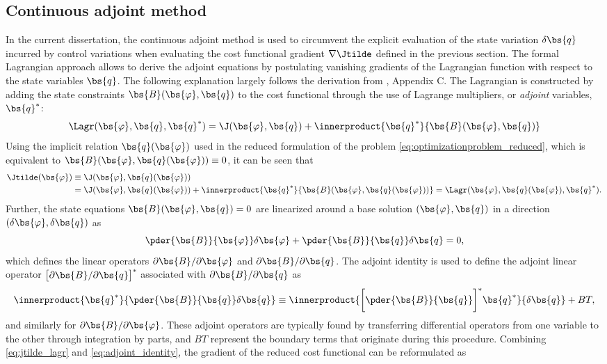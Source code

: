 	\subsection{Continuous adjoint method}
	In the current dissertation, the continuous adjoint method is used to circumvent the explicit evaluation of the state variation $\delta \bs{q}$ incurred by control variations when evaluating the cost functional gradient $\nabla \Jtilde$ defined in the previous section. The formal Lagrangian approach \citep{troltzsch, borzinschulz} allows to derive the adjoint equations by postulating vanishing gradients of the Lagrangian function with respect to the state variables $\bs{q}$. The following explanation largely follows the derivation from \cite{goit2015optimal}, Appendix C. The Lagrangian is constructed by adding the state constraints $\bs{B}(\bs{\varphi}, \bs{q})$ to the cost functional through the use of Lagrange multipliers, or \emph{adjoint} variables, $\bs{q}^*$:
	\begin{equation}
		\Lagr(\bs{\varphi}, \bs{q}, \bs{q}^*) = \J(\bs{\varphi}, \bs{q}) + \innerproduct{\bs{q}^*}{\bs{B}(\bs{\varphi}, \bs{q})}
	\end{equation} 
	Using the implicit relation $\bs{q}(\bs{\varphi})$ used in the reduced formulation of the problem 
	\eqref{eq:optimizationproblem_reduced}, which is equivalent to $\bs{B}(\bs{\varphi}, \bs{q}(\bs{\varphi})) \equiv 0$, it can be seen that
	\begin{align}
	\Jtilde(\bs{\varphi}) &\equiv  \J(\bs{\varphi}, \bs{q}(\bs{\varphi})) \nonumber\\ 
						  & = \J(\bs{\varphi}, \bs{q}(\bs{\varphi})) + \innerproduct{\bs{q}^*}{\bs{B}(\bs{\varphi}, \bs{q}(\bs{\varphi}))} =\Lagr(\bs{\varphi}, \bs{q}(\bs{\varphi}), \bs{q}^*). \label{eq:jtilde_lagr}
	\end{align} 
	Further, the state equations $\bs{B}(\bs{\varphi}, \bs{q}) = 0$ are linearized around a base solution $(\bs{\varphi}, \bs{q})$ in a direction $(\delta \bs{\varphi}, \delta \bs{q})$ as
	\begin{equation}
		\pder{\bs{B}}{\bs{\varphi}} \delta \bs{\varphi} + \pder{\bs{B}}{\bs{q}} \delta \bs{q} = 0, 
	\end{equation}
	which defines the linear operators $\partial \bs{B} /\partial \bs{\varphi}$ and $\partial \bs{B} /\partial \bs{q}$. The adjoint identity is used to define the adjoint linear operator $\big[ \partial \bs{B} /\partial \bs{q}\big]^*$ associated with $\partial \bs{B} /\partial \bs{q}$ as
	\begin{equation}
		\innerproduct{\bs{q}^* }{\pder{\bs{B}}{\bs{q}} \delta \bs{q}} \equiv \innerproduct{\bigg[     \pder{\bs{B}}{\bs{q}}\bigg]^* \bs{q}^* }{ \delta \bs{q} } + BT,  \label{eq:adjoint_identity}
	\end{equation}
	and similarly for $\partial \bs{B} /\partial \bs{\varphi}$. These adjoint operators are typically found by transferring differential operators from one variable to the other through integration by parts, and $BT$ represent the boundary terms that originate during this procedure. Combining \eqref{eq:jtilde_lagr} and \eqref{eq:adjoint_identity}, the gradient of the reduced cost functional can be reformulated as	
	
